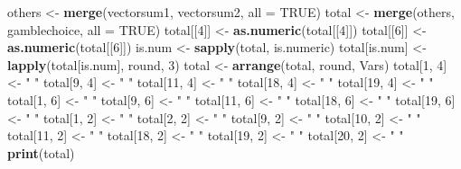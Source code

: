 \documentclass[]{tufte-handout}
\newenvironment{Shaded}{\begin{snugshade}}{\end{snugshade}}
\newcommand{\KeywordTok}[1]{\textcolor[rgb]{0.13,0.29,0.53}{\textbf{#1}}}
\newcommand{\DataTypeTok}[1]{\textcolor[rgb]{0.13,0.29,0.53}{#1}}
\newcommand{\DecValTok}[1]{\textcolor[rgb]{0.00,0.00,0.81}{#1}}
\newcommand{\StringTok}[1]{\textcolor[rgb]{0.31,0.60,0.02}{#1}}
\newcommand{\OtherTok}[1]{\textcolor[rgb]{0.56,0.35,0.01}{#1}}
\newcommand{\NormalTok}[1]{#1}
\begin{document}
\begin{Shaded}
\begin{Highlighting}[]
\NormalTok{others <-}\StringTok{ }\KeywordTok{merge}\NormalTok{(vectorsum1, vectorsum2, }\DataTypeTok{all =} \OtherTok{TRUE}\NormalTok{)}
\NormalTok{total <-}\StringTok{ }\KeywordTok{merge}\NormalTok{(others, gamblechoice, }\DataTypeTok{all =} \OtherTok{TRUE}\NormalTok{)}
\NormalTok{total[[}\DecValTok{4}\NormalTok{]] <-}\StringTok{ }\KeywordTok{as.numeric}\NormalTok{(total[[}\DecValTok{4}\NormalTok{]])}
\NormalTok{total[[}\DecValTok{6}\NormalTok{]] <-}\StringTok{ }\KeywordTok{as.numeric}\NormalTok{(total[[}\DecValTok{6}\NormalTok{]])}
\NormalTok{is.num <-}\StringTok{ }\KeywordTok{sapply}\NormalTok{(total, is.numeric)}
\NormalTok{total[is.num] <-}\StringTok{ }\KeywordTok{lapply}\NormalTok{(total[is.num], round, }
    \DecValTok{3}\NormalTok{)}
\NormalTok{total <-}\StringTok{ }\KeywordTok{arrange}\NormalTok{(total, round, Vars)}
\NormalTok{total[}\DecValTok{1}\NormalTok{, }\DecValTok{4}\NormalTok{] <-}\StringTok{ " "}
\NormalTok{total[}\DecValTok{9}\NormalTok{, }\DecValTok{4}\NormalTok{] <-}\StringTok{ " "}
\NormalTok{total[}\DecValTok{11}\NormalTok{, }\DecValTok{4}\NormalTok{] <-}\StringTok{ " "}
\NormalTok{total[}\DecValTok{18}\NormalTok{, }\DecValTok{4}\NormalTok{] <-}\StringTok{ " "}
\NormalTok{total[}\DecValTok{19}\NormalTok{, }\DecValTok{4}\NormalTok{] <-}\StringTok{ " "}
\NormalTok{total[}\DecValTok{1}\NormalTok{, }\DecValTok{6}\NormalTok{] <-}\StringTok{ " "}
\NormalTok{total[}\DecValTok{9}\NormalTok{, }\DecValTok{6}\NormalTok{] <-}\StringTok{ " "}
\NormalTok{total[}\DecValTok{11}\NormalTok{, }\DecValTok{6}\NormalTok{] <-}\StringTok{ " "}
\NormalTok{total[}\DecValTok{18}\NormalTok{, }\DecValTok{6}\NormalTok{] <-}\StringTok{ " "}
\NormalTok{total[}\DecValTok{19}\NormalTok{, }\DecValTok{6}\NormalTok{] <-}\StringTok{ " "}
\NormalTok{total[}\DecValTok{1}\NormalTok{, }\DecValTok{2}\NormalTok{] <-}\StringTok{ " "}
\NormalTok{total[}\DecValTok{2}\NormalTok{, }\DecValTok{2}\NormalTok{] <-}\StringTok{ " "}
\NormalTok{total[}\DecValTok{9}\NormalTok{, }\DecValTok{2}\NormalTok{] <-}\StringTok{ " "}
\NormalTok{total[}\DecValTok{10}\NormalTok{, }\DecValTok{2}\NormalTok{] <-}\StringTok{ " "}
\NormalTok{total[}\DecValTok{11}\NormalTok{, }\DecValTok{2}\NormalTok{] <-}\StringTok{ " "}
\NormalTok{total[}\DecValTok{18}\NormalTok{, }\DecValTok{2}\NormalTok{] <-}\StringTok{ " "}
\NormalTok{total[}\DecValTok{19}\NormalTok{, }\DecValTok{2}\NormalTok{] <-}\StringTok{ " "}
\NormalTok{total[}\DecValTok{20}\NormalTok{, }\DecValTok{2}\NormalTok{] <-}\StringTok{ " "}
\KeywordTok{print}\NormalTok{(total)}
\end{Highlighting}
\end{Shaded}
\end{document}
